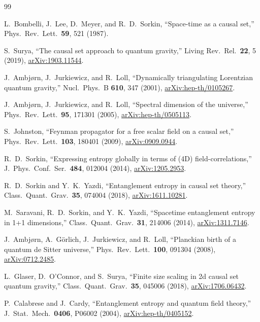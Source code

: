 \documentclass[aps,prd,twocolumn,superscriptaddress,nofootinbib]{revtex4-2}
\begin{document}
\begin{thebibliography}{99}

L.~Bombelli, J.~Lee, D.~Meyer, and R.~D.~Sorkin,
``Space-time as a causal set,''
Phys.\ Rev.\ Lett.\ \textbf{59}, 521 (1987).

S.~Surya,
``The causal set approach to quantum gravity,''
Living Rev.\ Rel.\ \textbf{22}, 5 (2019),
\href{https://arxiv.org/abs/1903.11544}{arXiv:1903.11544}.

J.~Ambj\o{}rn, J.~Jurkiewicz, and R.~Loll,
``Dynamically triangulating Lorentzian quantum gravity,''
Nucl.\ Phys.\ B \textbf{610}, 347 (2001),
\href{https://arxiv.org/abs/hep-th/0105267}{arXiv:hep-th/0105267}.

J.~Ambj\o{}rn, J.~Jurkiewicz, and R.~Loll,
``Spectral dimension of the universe,''
Phys.\ Rev.\ Lett.\ \textbf{95}, 171301 (2005),
\href{https://arxiv.org/abs/hep-th/0505113}{arXiv:hep-th/0505113}.

S.~Johnston,
``Feynman propagator for a free scalar field on a causal set,''
Phys.\ Rev.\ Lett.\ \textbf{103}, 180401 (2009),
\href{https://arxiv.org/abs/0909.0944}{arXiv:0909.0944}.

R.~D.~Sorkin,
``Expressing entropy globally in terms of (4D) field-correlations,''
J.\ Phys.\ Conf.\ Ser.\ \textbf{484}, 012004 (2014),
\href{https://arxiv.org/abs/1205.2953}{arXiv:1205.2953}.

R.~D.~Sorkin and Y.~K.~Yazdi,
``Entanglement entropy in causal set theory,''
Class.\ Quant.\ Grav.\ \textbf{35}, 074004 (2018),
\href{https://arxiv.org/abs/1611.10281}{arXiv:1611.10281}.

M.~Saravani, R.~D.~Sorkin, and Y.~K.~Yazdi,
``Spacetime entanglement entropy in 1+1 dimensions,''
Class.\ Quant.\ Grav.\ \textbf{31}, 214006 (2014),
\href{https://arxiv.org/abs/1311.7146}{arXiv:1311.7146}.

J.~Ambj\o{}rn, A.~G\"orlich, J.~Jurkiewicz, and R.~Loll,
``Planckian birth of a quantum de Sitter universe,''
Phys.\ Rev.\ Lett.\ \textbf{100}, 091304 (2008),
\href{https://arxiv.org/abs/0712.2485}{arXiv:0712.2485}.

L.~Glaser, D.~O'Connor, and S.~Surya,
``Finite size scaling in 2d causal set quantum gravity,''
Class.\ Quant.\ Grav.\ \textbf{35}, 045006 (2018),
\href{https://arxiv.org/abs/1706.06432}{arXiv:1706.06432}.

P.~Calabrese and J.~Cardy,
``Entanglement entropy and quantum field theory,''
J.\ Stat.\ Mech.\ \textbf{0406}, P06002 (2004),
\href{https://arxiv.org/abs/hep-th/0405152}{arXiv:hep-th/0405152}.

\end{thebibliography}
\end{document}
